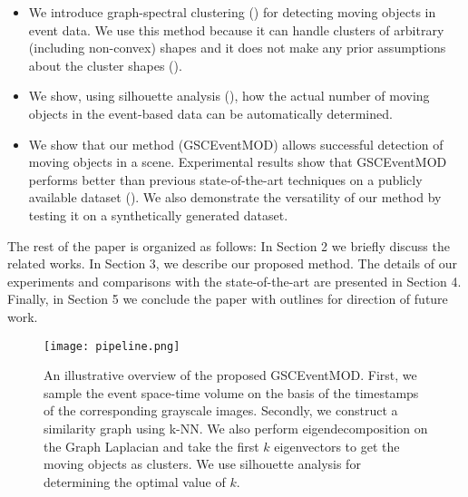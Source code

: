 \documentclass{article}
\begin{document}
\begin{itemize}[leftmargin=*]
    \itemsep0em
    \item We introduce graph-spectral clustering (\cite{martin2018robust,luo2003spectral,von2007tutorial,ng2001spectral,panda2017nystrom}) for detecting moving objects in event data. We use this method because it can handle clusters of arbitrary (including non-convex) shapes and it does not make any prior assumptions about the cluster shapes (\cite{meila2016spectral}).
    \item We show, using silhouette analysis (\cite{shutaywi2021silhouette}), how the actual number of moving objects in the event-based data can be automatically determined.
    \item We show that our method (GSCEventMOD) allows successful detection of moving objects in a scene. Experimental results show that GSCEventMOD performs better than previous state-of-the-art techniques on a publicly available dataset (\cite{almatrafi2020distance}). We also demonstrate the versatility of our method by testing it on a synthetically generated dataset.
\end{itemize}
The rest of the paper is organized as follows:
In Section 2 we briefly discuss the related works. In Section 3, we describe our proposed method. The details of our experiments and comparisons with the state-of-the-art are presented in Section 4. Finally, in Section 5 we conclude the paper with outlines for direction of future work.

\begin{figure*}
\begin{center}
\texttt{[image: pipeline.png]}
\end{center}
   \caption{An illustrative overview of the proposed GSCEventMOD. First, we sample the event space-time volume on the basis of the timestamps of the corresponding grayscale images. Secondly, we construct a similarity graph using k-NN. We also perform eigendecomposition on the Graph Laplacian and take the first $k$ eigenvectors to get the moving objects as clusters. We use silhouette analysis for determining the optimal value of $k$.}
    \label{fig:pipeline}
\label{fig:short}
\end{figure*}
\end{document}
